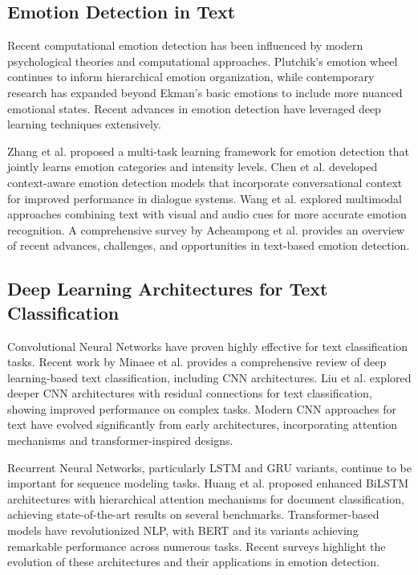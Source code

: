 \documentclass[12pt,a4paper]{article}
\begin{document}
\subsection{Emotion Detection in Text}

Recent computational emotion detection has been influenced by modern psychological theories and computational approaches. Plutchik's emotion wheel \cite{plutchik2021emotion} continues to inform hierarchical emotion organization, while contemporary research has expanded beyond Ekman's basic emotions to include more nuanced emotional states. Recent advances in emotion detection have leveraged deep learning techniques extensively.

Zhang et al. \cite{zhang2021emotion} proposed a multi-task learning framework for emotion detection that jointly learns emotion categories and intensity levels. Chen et al. \cite{chen2022contextual} developed context-aware emotion detection models that incorporate conversational context for improved performance in dialogue systems. Wang et al. \cite{wang2023multimodal} explored multimodal approaches combining text with visual and audio cues for more accurate emotion recognition. A comprehensive survey by Acheampong et al. \cite{acheampong2022text} provides an overview of recent advances, challenges, and opportunities in text-based emotion detection.

\subsection{Deep Learning Architectures for Text Classification}

Convolutional Neural Networks have proven highly effective for text classification tasks. Recent work by Minaee et al. \cite{minase2021deep} provides a comprehensive review of deep learning-based text classification, including CNN architectures. Liu et al. \cite{liu2022deep} explored deeper CNN architectures with residual connections for text classification, showing improved performance on complex tasks. Modern CNN approaches for text have evolved significantly from early architectures, incorporating attention mechanisms and transformer-inspired designs.

Recurrent Neural Networks, particularly LSTM and GRU variants, continue to be important for sequence modeling tasks. Huang et al. \cite{huang2021biLSTM} proposed enhanced BiLSTM architectures with hierarchical attention mechanisms for document classification, achieving state-of-the-art results on several benchmarks. Transformer-based models have revolutionized NLP, with BERT \cite{devlin2019bert} and its variants achieving remarkable performance across numerous tasks. Recent surveys highlight the evolution of these architectures and their applications in emotion detection.
\end{document}
